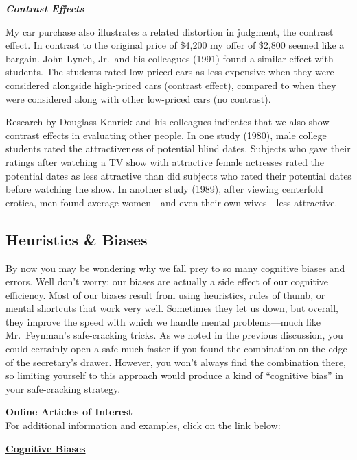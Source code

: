 \documentclass[
]{book}
\begin{document}
\textbf{\emph{Contrast Effects}}

My car purchase also illustrates a related distortion in judgment, the contrast effect. In contrast to the original price of \$4,200 my offer of \$2,800 seemed like a bargain. John Lynch, Jr.~and his colleagues (1991) found a similar effect with students. The students rated low-priced cars as less expensive when they were considered alongside high-priced cars (contrast effect), compared to when they were considered along with other low-priced cars (no contrast).

Research by Douglass Kenrick and his colleagues indicates that we also show contrast effects in evaluating other people. In one study (1980), male college students rated the attractiveness of potential blind dates. Subjects who gave their ratings after watching a TV show with attractive female actresses rated the potential dates as less attractive than did subjects who rated their potential dates before watching the show. In another study (1989), after viewing centerfold erotica, men found average women---and even their own wives---less attractive.

\hypertarget{heuristics-biases}{%
\subsection*{Heuristics \& Biases}\label{heuristics-biases}}

By now you may be wondering why we fall prey to so many cognitive biases and errors. Well don't worry; our biases are actually a side effect of our cognitive efficiency. Most of our biases result from using heuristics, rules of thumb, or mental shortcuts that work very well. Sometimes they let us down, but overall, they improve the speed with which we handle mental problems---much like Mr.~Feynman's safe-cracking tricks. As we noted in the previous discussion, you could certainly open a safe much faster if you found the combination on the edge of the secretary's drawer. However, you won't always find the combination there, so limiting yourself to this approach would produce a kind of ``cognitive bias'' in your safe-cracking strategy.

\begin{caution}
\textbf{Online Articles of Interest}\\
For additional information and examples, click on the link below:

\href{https://en.wikipedia.org/wiki/List_of_cognitive_biases}{\textbf{Cognitive Biases}}
\end{caution}
\end{document}

